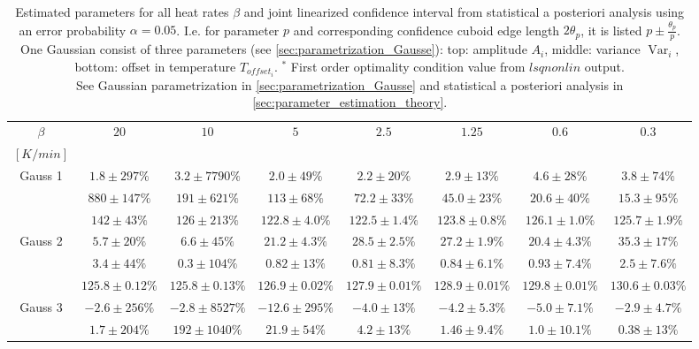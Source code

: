 \documentclass{scrartcl}[12pt, halfparskip]
\numberwithin{equation}{section}
\numberwithin{figure}{section}
\numberwithin{table}{section}
\newcommand{\var}{\operatorname{Var}}
\begin{document}
\newpage
\begin{landscape}
	


\begin{table}[H]
	\centering
	\caption{Estimated parameters for all heat rates $\beta$ and joint linearized confidence interval from statistical a posteriori analysis using an error probability $\alpha=0.05$. I.e. for parameter $p$ and corresponding confidence cuboid edge length $2\theta_p$, it is listed $p \pm \frac{\theta_p}{p}$.
	One Gaussian consist of three parameters (see \cref{sec:parametrization_Gausse}): top: amplitude $A_i$, middle: variance $\var_i$, bottom: offset in temperature $T_{offset_i}$. $^*$ First order optimality condition value from $lsqnonlin$ output. \\
	See Gaussian parametrization in \cref{sec:parametrization_Gausse} and statistical a posteriori analysis in \cref{sec:parameter_estimation_theory}.}
	\begin{tabular}{| c | c | c | c | c | c | c | c |} \hline
		$\beta$ & $20$ & $10$ & $5$ & $2.5$ & $1.25$ & $0.6$ & $0.3$ \\ 
		$[K/min]$ & & & & & & & \\ \hline
		Gauss 1 & $1.8 \pm 297\%$ & $3.2 \pm 7790\%$ & $2.0 \pm 49\%$ & $2.2 \pm 20\%$ & $2.9 \pm 13\%$ & $4.6 \pm 28\%$ & $3.8 \pm 74\%$ \\
		& $880 \pm 147\%$ & $191 \pm 621\%$ & $113 \pm 68\%$ & $72.2 \pm 33\%$ & $45.0 \pm 23\%$ & $20.6 \pm 40\%$ & $15.3 \pm 95\%$ \\
		& $142 \pm 43\%$ & $126 \pm 213\%$ & $122.8 \pm 4.0\%$ & $122.5 \pm 1.4\%$ & $123.8 \pm 0.8\%$ & $126.1 \pm 1.0\%$ & $125.7 \pm 1.9\%$ \\ \hline
		Gauss 2 & $5.7 \pm 20\%$ & $6.6 \pm 45\%$ & $21.2 \pm 4.3\%$ & $28.5 \pm 2.5\%$ & $27.2 \pm 1.9\%$ & $20.4 \pm 4.3\%$ & $35.3 \pm 17\%$ \\
		& $3.4 \pm 44\%$ & $0.3 \pm 104\%$ & $0.82 \pm 13\%$ & $0.81 \pm 8.3\%$ & $0.84 \pm 6.1\%$ & $0.93 \pm 7.4\%$ & $2.5 \pm 7.6\%$ \\
		& $125.8 \pm 0.12\%$ & $125.8 \pm 0.13\%$ & $126.9 \pm 0.02\%$ & $127.9 \pm 0.01\%$ & $128.9 \pm 0.01\%$ & $129.8 \pm 0.01\%$ & $130.6 \pm 0.03\%$ \\ \hline
		Gauss 3 & $-2.6 \pm 256\%$ & $-2.8 \pm 8527\%$ & $-12.6 \pm 295\%$ & $-4.0 \pm 13\%$ & $-4.2 \pm 5.3\%$ & $-5.0 \pm 7.1\%$ & $-2.9 \pm 4.7\%$ \\
		& $1.7 \pm 204\%$ & $192 \pm 1040\%$ & $21.9 \pm 54\%$ & $4.2 \pm 13\%$ & $1.46 \pm 9.4\%$ & $1.0 \pm 10.1\%$ & $0.38 \pm 13\%$ \\

\end{tabular}
\end{table}
\end{landscape}
\end{document}

